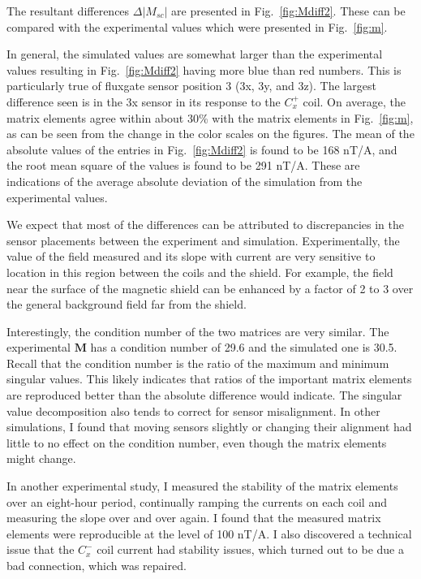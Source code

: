 The resultant differences $\Delta|M_{sc}|$ are presented in
Fig.~\ref{fig:Mdiff2}.  These can be compared with the experimental
values which were presented in Fig.~\ref{fig:m}.

In general, the simulated values are somewhat larger than the
experimental values resulting in Fig.~\ref{fig:Mdiff2} having more
blue than red numbers.  This is particularly true of fluxgate sensor
position 3 (3x, 3y, and 3z).  The largest difference seen is in the 3x
sensor in its response to the $C_x^+$ coil.  On average, the matrix
elements agree within about 30\% with the matrix elements in
Fig.~\ref{fig:m}, as can be seen from the change in the color scales
on the figures.  The mean of the absolute values of the entries in
Fig.~\ref{fig:Mdiff2} is found to be 168 nT/A, and the root mean
square of the values is found to be 291 nT/A.  These are indications
of the average absolute deviation of the simulation from the
experimental values.

We expect that most of the differences can be attributed to
discrepancies in the sensor placements between the experiment and
simulation.  Experimentally, the value of the field measured and its
slope with current are very sensitive to location in this region
between the coils and the shield.  For example, the field near the
surface of the magnetic shield can be enhanced by a factor of 2 to 3
over the general background field far from the shield.

Interestingly, the condition number of the two matrices are very
similar.  The experimental $\bm{M}$ has a condition number of 29.6 and the
simulated one is 30.5.  Recall that the condition number is the ratio
of the maximum and minimum singular values.  This likely indicates
that ratios of the important matrix elements are reproduced better
than the absolute difference would indicate.  The singular value
decomposition also tends to correct for sensor misalignment.  In other
simulations, I found that moving sensors slightly or changing their
alignment had little to no effect on the condition number, even though
the matrix elements might change.

In another experimental study, I measured the stability of the matrix
elements over an eight-hour period, continually ramping the currents
on each coil and measuring the slope over and over again.  I found
that the measured matrix elements were reproducible at the level of
100 nT/A.  I also discovered a technical issue that the $C_x^-$ coil
current had stability issues, which turned out to be due a bad
connection, which was repaired.

